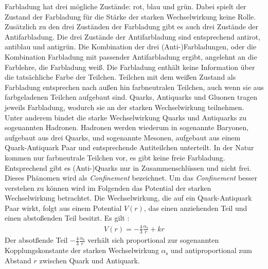 Farbladung hat drei m\"ogliche Zust\"ande: rot, blau und gr\"un.
Dabei spielt der Zustand der Farbladung f\"ur die St\"arke der starken Wechselwirkung keine Rolle.
Zus\"atzlich zu den drei Zust\"anden der Farbladung gibt es auch drei Zust\"ande der Antifarbladung. 
Die drei Zust\"ande der Antifarbladung sind entsprechend antirot, antiblau und antigr\"un.
Die Kombination der drei (Anti-)Farbladungen, oder die Kombination Farbladung mit passender Antifarbladung ergibt, angelehnt an die Farblehre, die Farbladung wei{\ss}.
Die Farbladung enth\"alt keine Information \"uber die tats\"achliche Farbe der Teilchen.
Teilchen mit dem wei{\ss}en Zustand als Farbladung entsprechen nach au{\ss}en hin farbneutralen Teilchen, auch wenn sie aus farbgeladenen Teilchen aufgebaut sind.
\newline
Quarks, Antiquarks und Gluonen tragen jeweils Farbladung, wodurch sie an der starken Wechselwirkung teilnehmen.
Unter anderem bindet die starke Wechselwirkung Quarks und Antiquarks zu sogenannten Hadronen. %
Hadronen werden wiederum in sogenannte Baryonen, aufgebaut aus drei Quarks, und sogenannte Mesonen, aufgebaut aus einem Quark-Antiquark Paar und entsprechende Antiteilchen unterteilt.
In der Natur kommen nur farbneutrale Teilchen vor, es gibt keine freie Farbladung.
Entsprechend gibt es (Anti-)Quarks nur in Zusammenschl\"ussen und nicht frei. 
Dieses Ph\"anomen wird als \textit{Confinement} bezeichnet.
Um das \textit{Confinement} besser verstehen zu k\"onnen wird im Folgenden das Potential der starken Wechselwirkung betrachtet.
\newline
Die Wechselwirkung, die auf ein Quark-Antiquark Paar wirkt, folgt aus einem Potential $V(r)$, das einen anziehenden Teil und einen abstoßenden Teil besitzt.
Es gilt \cite{HennerSkript}:
\begin{align} \label{eq:Potential}
V(r) = -\frac{4}{3}\frac{\alpha_\text{s}}{r} + kr 
\end{align}
Der absot{\ss}ende Teil $-\frac{4}{3}\frac{\alpha_\text{s}}{r}$ verh\"alt sich proportional zur sogenannten Kopplungskonstante der starken Wechselwirkung $\alpha_{\text{s}}$ und antiproportional zum Abstand $r$ zwischen Quark und Antiquark.
